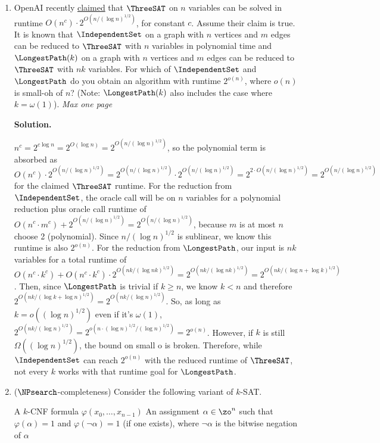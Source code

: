 \documentclass[11pt]{article}
\newenvironment{soln}{%
  \par\medskip\noindent\begingroup\color{blue}\textbf{Solution.}\ %
}{%
  \endgroup\par\medskip%
}
\begin{document}
\begin{enumerate}
\item OpenAI recently \href{https://openai.com/index/building-scientific-understanding-with-academic-communities/}{claimed} that $\ThreeSAT$ on $n$ variables can be solved in runtime $O(n^c) \cdot 2^{O(n/(\log n)^{1/2})}$, for constant $c$. Assume their claim is true. It is known that $\IndependentSet$ on a graph with $n$ vertices and $m$ edges can be reduced to $\ThreeSAT$ with $n$ variables in polynomial time and $\LongestPath(k)$ on a graph with $n$ vertices and $m$ edges can be reduced to $\ThreeSAT$ with $nk$ variables. For which of $\IndependentSet$ and $\LongestPath$ do you obtain an algorithm with runtime $2^{o(n)}$, where $o(n)$ is small-oh of $n$? (Note: $\LongestPath(k)$ also includes the case where $k=\omega(1)$). \textit{Max one page}

\begin{soln}
$n^c=2^{c\log n}=2^{O(\log n)}=2^{O(n/(\log n)^{1/2})}$, so the polynomial term is absorbed as $O(n^c) \cdot 2^{O(n/(\log n)^{1/2})}=2^{O(n/(\log n)^{1/2})}\cdot2^{O(n/(\log n)^{1/2})}=2^{2\cdot O(n/(\log n)^{1/2})}=2^{O(n/(\log n)^{1/2})}$ for the claimed $\ThreeSAT$ runtime. For the reduction from $\IndependentSet$, the oracle call will be on $n$ variables for a polynomial reduction plus oracle call runtime of $O(n^c\cdot m^c)+2^{O(n/(\log n)^{1/2})}=2^{O(n/(\log n)^{1/2})}$, because $m$ is at most $n$ choose 2 (polynomial). Since $n/(\log n)^{1/2}$ is sublinear, we know this runtime is also $2^{o(n)}$. For the reduction from $\LongestPath$, our input is $nk$ variables for a total runtime of $O(n^c\cdot k^c)+O(n^c\cdot k^c)\cdot2^{O(nk/(\log nk)^{1/2})}=2^{O(nk/(\log nk)^{1/2})}=2^{O(nk/(\log n+\log k)^{1/2})}$. Then, since $\LongestPath$ is trivial if $k\geq n$, we know $k<n$ and therefore $2^{O(nk/(\log k+\log n)^{1/2})}=2^{O(nk/(\log n)^{1/2})}$. So, as long as $k=o((\log n)^{1/2})$ even if it's $\omega(1)$, $2^{O(nk/(\log n)^{1/2})}=2^{o(n\cdot (\log n)^{1/2}/(\log n)^{1/2})}=2^{o(n)}$. However, if $k$ is still $\Omega((\log n)^{1/2})$, the bound on small o is broken. Therefore, while $\IndependentSet$ can reach $2^{o(n)}$ with the reduced runtime of $\ThreeSAT$, not every $k$ works with that runtime goal for $\LongestPath$.
\end{soln}

\item ($\NPsearch$-completeness) Consider the following variant of $k$-SAT.

       \compprob{\FlipkSAT}
        {A $k$-CNF formula $\varphi(x_0,\ldots,x_{n-1})$}
        {An assignment $\alpha\in\zo^n$ such that $\varphi(\alpha)=1$ and $\varphi(\neg \alpha)=1$ (if one exists), where $\neg \alpha$ is the bitwise negation of $\alpha$}


\end{enumerate}
\end{document}

